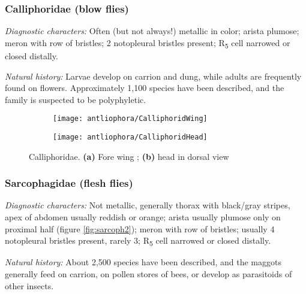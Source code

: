 \subsubsection{Calliphoridae (blow flies)}
\noindent{}\textit{Diagnostic characters:} Often (but not always!) metallic in color; arista plumose; meron with row of bristles; 2 notopleural bristles present; \texorpdfstring{R\textsubscript{5}}{R5} cell narrowed or closed distally.\vspace{3mm}

\noindent{}\textit{Natural history:} Larvae develop on carrion and dung, while adults are frequently found on flowers. Approximately 1,100 species have been described, and the family is suspected to be polyphyletic.\vspace{3mm}

\begin{figure}[ht!]
    \centering
    \begin{subfigure}[ht!]{0.5\textwidth}
        \texttt{[image: antliophora/CalliphoridWing]}
        \caption{}
        \label{fig:calliphorid1}
    \end{subfigure}
    \qquad
    \begin{subfigure}[ht!]{0.3\textwidth}
        \texttt{[image: antliophora/CalliphoridHead]}
        \caption{}
        \label{fig:calliphorid2}
    \end{subfigure}
    \caption{Calliphoridae. \textbf{(a)} Fore wing \citep[][Fig. 106.6]{mcalpine1981manualv2}; \textbf{(b)} head in dorsal view \citep[][Fig. 106.18]{mcalpine1981manualv2}}\label{fig:calliphorids}
\end{figure}

\subsubsection{Sarcophagidae (flesh flies)}
\noindent{}\textit{Diagnostic characters:} Not metallic, generally thorax with black/gray stripes, apex of abdomen usually reddish or orange; arista usually plumose only on proximal half (figure \ref{fig:sarcoph2}); meron with row of bristles; usually 4 notopleural bristles present, rarely 3; \texorpdfstring{R\textsubscript{5}}{R5} cell narrowed or closed distally.\vspace{3mm}

\noindent{}\textit{Natural history:} About 2,500 species have been described, and the maggots generally feed on carrion, on pollen stores of bees, or develop as parasitoids of other insects. 

